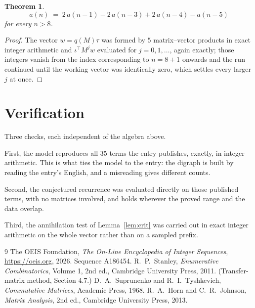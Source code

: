 \documentclass[11pt,a4paper]{article}
\theoremstyle{plain}
\newtheorem{theorem}{Theorem}
\theoremstyle{definition}
\begin{document}
\begin{theorem}
\[
a(n)\;=\;2\,a(n-1) - 2\,a(n-3) + 2\,a(n-4) - a(n-5)
\]
for every $n>8$.
\end{theorem}

\begin{proof}
The vector $w=q(M)\tau$ was formed by $5$ matrix--vector products in exact integer
arithmetic and $\iota^{\!\top}M^{j}w$ evaluated for $j=0,1,\dots$, again exactly; those
integers vanish from the index corresponding to $n=8+1$ onwards and the run continued
until the working vector was identically zero, which settles every larger $j$ at once.
\end{proof}

\section{Verification}

Three checks, each independent of the algebra above.

First, the model reproduces all $35$ terms the entry publishes, exactly, in integer
arithmetic. This is what ties the model to the entry: the digraph is built by reading the
entry's English, and a misreading gives different counts.

Second, the conjectured recurrence was evaluated directly on those published terms, with no
matrices involved, and holds wherever the proved range and the data overlap.

Third, the annihilation test of Lemma~\ref{lem:crit} was carried out in exact integer
arithmetic on the whole vector rather than on a sampled prefix.

\begin{thebibliography}{9}
 The OEIS Foundation, \emph{The On-Line Encyclopedia of Integer
Sequences}, \url{https://oeis.org}, 2026. Sequence A186454.
 R.~P.~Stanley, \emph{Enumerative Combinatorics}, Volume 1, 2nd ed.,
Cambridge University Press, 2011. (Transfer-matrix method, Section 4.7.)
 D.~A.~Suprunenko and R.~I.~Tyshkevich, \emph{Commutative Matrices},
Academic Press, 1968.
 R.~A.~Horn and C.~R.~Johnson, \emph{Matrix Analysis}, 2nd ed., Cambridge
University Press, 2013.
\end{thebibliography}
\end{document}

